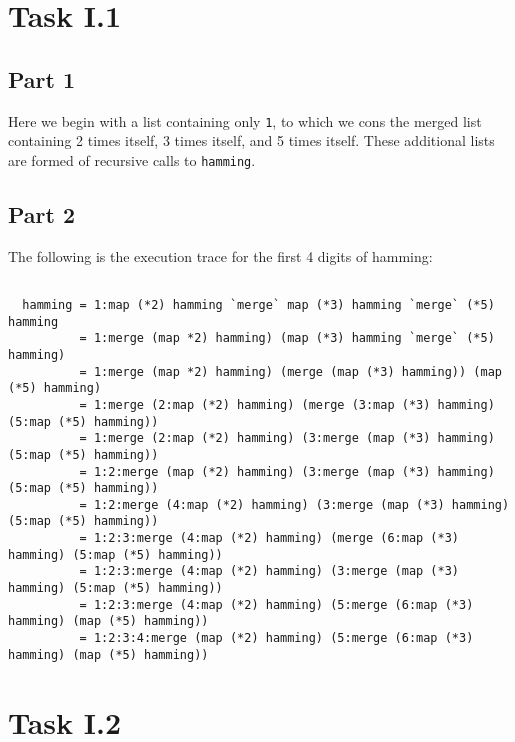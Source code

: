 \documentclass[11pt]{article}
\begin{document}
\maketitle
\tableofcontents

\section{Task I.1}

\subsection{Part 1}


Here we begin with a list containing only \verb|1|, to which we cons the merged list containing 2 times itself, 3 times itself, and 5 times itself.
These additional lists are formed of recursive calls to \verb|hamming|.

\subsection{Part 2}

The following is the execution trace for the first 4 digits of hamming:
\begin{lstlisting}[basicstyle=\tiny]

  hamming = 1:map (*2) hamming `merge` map (*3) hamming `merge` (*5) hamming
          = 1:merge (map *2) hamming) (map (*3) hamming `merge` (*5) hamming)
          = 1:merge (map *2) hamming) (merge (map (*3) hamming)) (map (*5) hamming)
          = 1:merge (2:map (*2) hamming) (merge (3:map (*3) hamming) (5:map (*5) hamming))
          = 1:merge (2:map (*2) hamming) (3:merge (map (*3) hamming) (5:map (*5) hamming))
          = 1:2:merge (map (*2) hamming) (3:merge (map (*3) hamming) (5:map (*5) hamming))
          = 1:2:merge (4:map (*2) hamming) (3:merge (map (*3) hamming) (5:map (*5) hamming))
          = 1:2:3:merge (4:map (*2) hamming) (merge (6:map (*3) hamming) (5:map (*5) hamming))
          = 1:2:3:merge (4:map (*2) hamming) (3:merge (map (*3) hamming) (5:map (*5) hamming))
          = 1:2:3:merge (4:map (*2) hamming) (5:merge (6:map (*3) hamming) (map (*5) hamming))
          = 1:2:3:4:merge (map (*2) hamming) (5:merge (6:map (*3) hamming) (map (*5) hamming))

\end{lstlisting}

\section{Task I.2}
\end{document}
